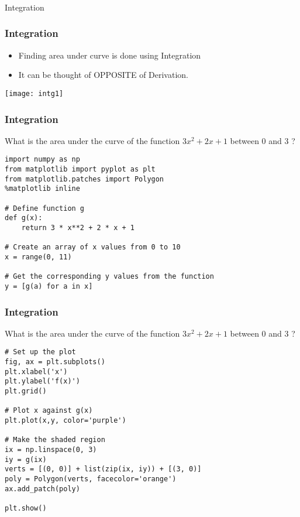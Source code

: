 \begin{frame}[fragile]\frametitle{}
\begin{center}
{\Large Integration}
\end{center}
\end{frame}

 \begin{frame}[fragile] \frametitle{Integration}


\begin{itemize}
\item Finding area under curve is done using Integration
\item It can be thought of OPPOSITE of Derivation.
\end{itemize}
\begin{center}
\texttt{[image: intg1]}
\end{center}

\end{frame}


 \begin{frame}[fragile] \frametitle{Integration}
What is the area under the curve of the function  $3x^2 + 2x + 1$  between 0  and  3 ?

\begin{lstlisting}
import numpy as np
from matplotlib import pyplot as plt
from matplotlib.patches import Polygon
%matplotlib inline

# Define function g
def g(x):
    return 3 * x**2 + 2 * x + 1

# Create an array of x values from 0 to 10
x = range(0, 11)

# Get the corresponding y values from the function
y = [g(a) for a in x]
\end{lstlisting}


\end{frame}

 \begin{frame}[fragile] \frametitle{Integration}
What is the area under the curve of the function  $3x^2 + 2x + 1$  between 0  and  3 ?

\begin{lstlisting}
# Set up the plot
fig, ax = plt.subplots()
plt.xlabel('x')
plt.ylabel('f(x)')
plt.grid()

# Plot x against g(x)
plt.plot(x,y, color='purple')

# Make the shaded region
ix = np.linspace(0, 3)
iy = g(ix)
verts = [(0, 0)] + list(zip(ix, iy)) + [(3, 0)]
poly = Polygon(verts, facecolor='orange')
ax.add_patch(poly)

plt.show()
\end{lstlisting}


\end{frame}


